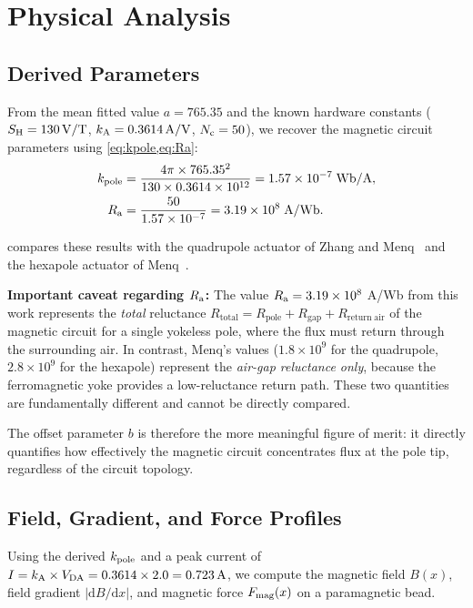 \section{Physical Analysis}
\label{sec:physics}

\subsection{Derived Parameters}
\label{sec:derived-params}

From the mean fitted value $a = 765.35$ and the known hardware constants
($S_\mathrm{H} = \SI{130}{\volt/\tesla}$, $k_\mathrm{A} = \SI{0.3614}{\ampere/\volt}$,
$N_\mathrm{c} = 50$), we recover the magnetic circuit parameters using
\cref{eq:kpole,eq:Ra}:
\begin{align}
k_\mathrm{pole} &= \frac{4\pi \times 765.35^2}{130 \times 0.3614 \times 10^{12}}
        = 1.57 \times 10^{-7} \;\text{Wb/A}, \\
R_\mathrm{a}    &= \frac{50}{1.57 \times 10^{-7}}
        = 3.19 \times 10^{8} \;\text{A/Wb}.
\end{align}

 compares these results with the quadrupole
actuator of Zhang and Menq~\cite{Zhang2010} and the hexapole actuator of
Menq~\cite{Menq2011}.



\textbf{Important caveat regarding $R_\mathrm{a}$:} The value $R_\mathrm{a} = 3.19 \times 10^8$
A/Wb from this work represents the \emph{total} reluctance
$R_\mathrm{total} = R_\mathrm{pole} + R_\mathrm{gap} + R_\mathrm{return\;air}$
of the magnetic circuit for a single yokeless pole, where the flux must return
through the surrounding air. In contrast, Menq's values
($1.8 \times 10^9$ for the quadrupole, $2.8 \times 10^9$ for the hexapole)
represent the \emph{air-gap reluctance only}, because the ferromagnetic yoke
provides a low-reluctance return path. These two quantities are fundamentally
different and cannot be directly compared.

The offset parameter $b$ is therefore the more meaningful figure of merit:
it directly quantifies how effectively the magnetic circuit concentrates flux
at the pole tip, regardless of the circuit topology.

\subsection{Field, Gradient, and Force Profiles}
\label{sec:force-profiles}

Using the derived $k_\mathrm{pole}$ and a peak current of
$I = k_\mathrm{A} \times V_\mathrm{DA} = 0.3614 \times 2.0 = \SI{0.723}{\ampere}$,
we compute the magnetic field $B(x)$, field gradient $|\mathrm{d}B/\mathrm{d}x|$,
and magnetic force $F_\mathrm{mag}(x)$ on a paramagnetic bead.

